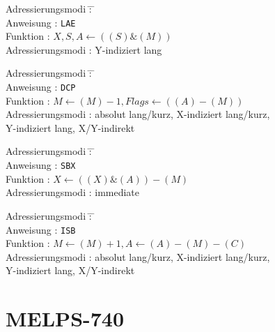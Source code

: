 \documentclass[12pt,a4paper,twoside]{report}
\newcommand{\tty}[1]{{\tt #1}}
\begin{document}
{\begin{tabbing}
\end{tabbing}
\begin{tabbing}
Adressierungsmodi \= : \= \kill \\
Anweisung         \> : \> \tty{LAE} \\
Funktion          \> : \> $X,S,A\leftarrow((S)\&(M))$ \\
Adressierungsmodi \> : \> Y-indiziert lang \\
\end{tabbing}
\begin{tabbing}
Adressierungsmodi \= : \= \kill \\
Anweisung         \> : \> \tty{DCP} \\
Funktion          \> : \> $M \leftarrow(M)-1, Flags\leftarrow((A)-(M))$ \\
Adressierungsmodi \> : \> absolut lang/kurz, X-indiziert lang/kurz, \\
                  \>   \> Y-indiziert lang, X/Y-indirekt \\
\end{tabbing}
\begin{tabbing}
Adressierungsmodi \= : \= \kill \\
Anweisung         \> : \> \tty{SBX} \\
Funktion          \> : \> $X\leftarrow((X)\&(A))-(M)$ \\
Adressierungsmodi \> : \> immediate \\
\end{tabbing}
\begin{tabbing}
Adressierungsmodi \= : \= \kill \\
Anweisung         \> : \> \tty{ISB} \\
Funktion          \> : \> $M\leftarrow(M)+1, A\leftarrow(A)-(M)-(C)$ \\
Adressierungsmodi \> : \> absolut lang/kurz, X-indiziert lang/kurz, \\
                  \>   \> Y-indiziert lang, X/Y-indirekt \\
\end{tabbing}


\section{MELPS-740}

}
\end{document}
